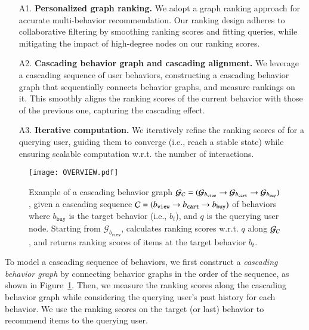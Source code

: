 \begin{enumerate}[leftmargin=8mm,noitemsep]
    \item[A1.]{
        \textbf{Personalized graph ranking.}
        We adopt a graph ranking approach for accurate multi-behavior recommendation. 
        Our ranking design adheres to collaborative filtering by smoothing ranking scores and fitting queries, while mitigating the impact of high-degree nodes on our ranking scores.
    }
    \item[A2.]{
        \textbf{Cascading behavior graph and cascading alignment.}
        We leverage a cascading sequence of user behaviors, constructing a cascading behavior graph that sequentially connects behavior graphs, and measure rankings on it. 
        This smoothly aligns the ranking scores of the current behavior with those of the previous one, capturing the cascading effect.
    }
    \item[A3.]{
        \textbf{Iterative computation.}
        We iteratively refine the ranking scores of \method for a querying user, guiding them to converge (i.e., reach a stable state) while ensuring scalable computation w.r.t. the number of interactions.
    }
\end{enumerate}

\begin{figure}[t]
    \centering
    \texttt{[image: OVERVIEW.pdf]}
    \caption{
        \label{fig:overview}
        Example of a cascading behavior graph $\mathcal{G}_{\mathcal{C}}=(\mathcal{G}_{b_{\texttt{view}}} \rightarrow \mathcal{G}_{b_{\texttt{cart}}} \rightarrow \mathcal{G}_{b_{\texttt{buy}}})$, given a cascading sequence $\mathcal{C} = (b_{\texttt{view}} \rightarrow b_{\texttt{cart}} \rightarrow b_{\texttt{buy}})$ of behaviors where $b_{\texttt{buy}}$ is the target behavior (i.e., $b_t$), and $q$ is the querying user node.
        Starting from $\mathcal{G}_{b_{\texttt{view}}}$, \method calculates ranking scores w.r.t. $q$ along $\mathcal{G}_{\mathcal{C}}$, and returns ranking scores of items at the target behavior $b_t$.
    }
\end{figure}

To model a cascading sequence of behaviors, we first construct a \textit{cascading behavior graph} by connecting behavior graphs in the order of the sequence, as shown in Figure~\ref{fig:overview}.
Then, we measure the ranking scores along the cascading behavior graph while considering the querying user’s past history for each behavior. 
We use the ranking scores on the target (or last) behavior to recommend items to the querying user.


